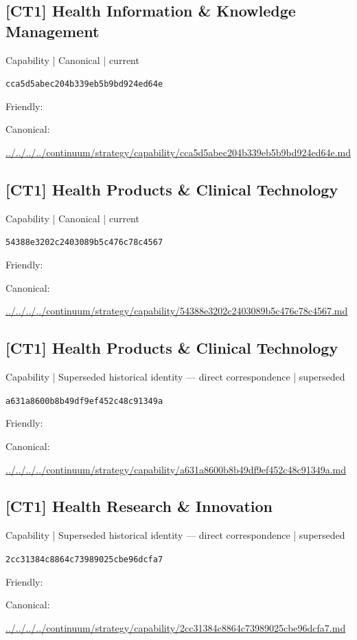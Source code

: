 \documentclass[10pt,a4paper]{article}
\begin{document}
\subsection*{[CT1] Health Information \& Knowledge Management}
{\small Capability | Canonical | current}\par
\texttt{cca5d5abec204b339eb5b9bd924ed64e}\par
Friendly: \par
Canonical: \par
{\footnotesize\url{../../../../continuum/strategy/capability/cca5d5abec204b339eb5b9bd924ed64e.md}}\par
\subsection*{[CT1] Health Products \& Clinical Technology}
{\small Capability | Canonical | current}\par
\texttt{54388e3202c2403089b5c476c78c4567}\par
Friendly: \par
Canonical: \par
{\footnotesize\url{../../../../continuum/strategy/capability/54388e3202c2403089b5c476c78c4567.md}}\par
\subsection*{[CT1] Health Products \& Clinical Technology}
{\small Capability | Superseded historical identity — direct correspondence | superseded}\par
\texttt{a631a8600b8b49df9ef452c48c91349a}\par
Friendly: \par
Canonical: \par
{\footnotesize\url{../../../../continuum/strategy/capability/a631a8600b8b49df9ef452c48c91349a.md}}\par
\subsection*{[CT1] Health Research \& Innovation}
{\small Capability | Superseded historical identity — direct correspondence | superseded}\par
\texttt{2cc31384c8864c73989025cbe96dcfa7}\par
Friendly: \par
Canonical: \par
{\footnotesize\url{../../../../continuum/strategy/capability/2cc31384c8864c73989025cbe96dcfa7.md}}\par
\end{document}
